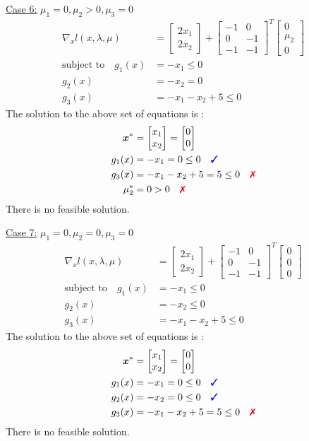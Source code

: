 \documentclass[a4paper,11pt]{article}
\newcommand{\V}[1]{\boldsymbol{#1}}
\newcommand{\mat}[1]{\begin{bmatrix}#1\end{bmatrix}}
\newcommand{\cmark}{{\color{blue}\text{\ding{51}}}}%
\newcommand{\xmark}{{\color{red}\text{\ding{55}}}}%
\begin{document}
\noindent\underline{Case 6:} $\mu_1=0, \mu_2>0, \mu_3=0$
\begin{align*}
 \nabla_x l(x,\lambda,\mu) &= \mat{2x_1\\ 2x_2} +
\mat{-1& 0\\ 0& -1\\-1& -1}^T\mat{0\\ \mu_2\\ 0}\\
% 
 \text{subject to}\quad g_1(x)&=-x_1 \leq 0\\
 g_2(x)&=-x_2 = 0\\
 g_3(x)&= -x_1 -x_2 +5 \leq0 
\end{align*}
The solution to the above set of equations is :
\begin{align*}
 \V{x}^*&=\mat{x_1\\x_2} = \mat{0\\0}\\
 g_1(x)&=-x_1 =0\leq 0 \quad \cmark\\
 g_3(x)&= -x_1 -x_2 +5 = 5 \leq0 \quad \xmark\\
 \mu_2^*&= 0>0 \quad \xmark
\end{align*}
There is no feasible solution.

\noindent\underline{Case 7:} $\mu_1=0, \mu_2=0, \mu_3=0$
\begin{align*}
 \nabla_x l(x,\lambda,\mu) &= \mat{2x_1\\ 2x_2} +
\mat{-1& 0\\ 0& -1\\-1& -1}^T\mat{0\\ 0\\ 0}\\
% 
 \text{subject to}\quad g_1(x)&=-x_1 \leq 0\\
 g_2(x)&=-x_2 \leq 0\\
 g_3(x)&= -x_1 -x_2 +5 \leq0 
\end{align*}
The solution to the above set of equations is :
\begin{align*}
 \V{x}^*&=\mat{x_1\\x_2} = \mat{0\\0}\\
 g_1(x)&=-x_1 =0\leq 0 \quad \cmark\\
 g_2(x)&=-x_2 =0\leq 0 \quad \cmark\\
 g_3(x)&= -x_1 -x_2 +5 = 5 \leq0 \quad \xmark
\end{align*}
There is no feasible solution.
\end{document}
